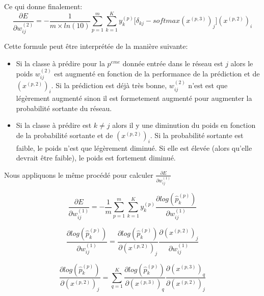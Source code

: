 \documentclass[a4paper,11pt,oneside,roman]{article}
\begin{document}
    Ce qui donne finalement:
    \begin{equation}
        \frac{\partial E}{\partial w_{ij}^{(2)}} = -\frac{1}{m \times ln(10)} \sum\limits_{p=1}^{m} \sum\limits_{k=1}^{K} y_k^{(p)} \bigg[ \delta_{kj} - softmax(x^{(p,3)})_j \bigg] (x^{(p,2)})_{i}
    \end{equation}

    Cette formule peut être interprétée de la manière suivante:
    \begin{itemize}
        \item Si la classe à prédire pour la $p^{eme}$ donnée entrée dans le réseau est $j$ alors le poids $w_{ij}^{(2)}$ est augmenté en fonction de la performance de la prédiction et de $(x^{(p,2)})_{i}$.
        Si la prédiction est déjà très bonne, $w_{ij}^{(2)}$ n'est est que légèrement augmenté sinon il est formetement augmenté pour augmenter la probabilité sortante du réseau.
        \item Si la classe à prédire est $k \ne j$ alors il y une diminution du poids en fonction de la probabilité sortante et de $(x^{(p,2)})_{i}$. Si la probabilité sortante est faible, le poids n'est que légèrement diminué. Si elle est élevée (alors qu'elle devrait être faible), le poids est fortement diminué.
    \end{itemize}

    Nous appliquons le même procédé pour calculer $\frac{\partial E}{\partial w_{ij}^{(1)}}$

    \begin{equation}
        \frac{\partial E}{\partial w_{ij}^{(1)}} = -\frac{1}{m} \sum\limits_{p=1}^{m} \sum\limits_{k=1}^{K} y_k^{(p)} \frac{\partial log(\hat{p}_{k}^{(p)})}{\partial w_{ij}^{(1)}}
        \label{E_wij1}
    \end{equation}

    \begin{equation}
        \frac{\partial log(\hat{p}_{k}^{(p)})}{\partial w_{ij}^{(1)}} = \frac{\partial log(\hat{p}_{k}^{(p)})}{\partial (x^{(p,2)})_j} \frac{\partial (x^{(p,2)})_j}{\partial w_{ij}^{(1)}}
        \label{log_wij}
    \end{equation}

    \begin{equation}
        \frac{\partial log(\hat{p}_{k}^{(p)})}{\partial (x^{(p,2)})_j} = \sum\limits_{q=1}^{K} \frac{\partial log(\hat{p}_{k}^{(p)})}{\partial (x^{(p,3)})_q} \frac{\partial (x^{(p,3)})_q}{\partial (x^{(p,2)})_j}
        \label{log_x2}
    \end{equation}
    
\end{document}
